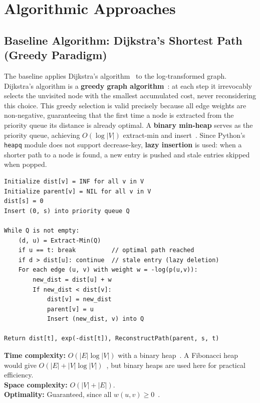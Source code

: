 \section{Algorithmic Approaches}

\subsection{Baseline Algorithm: Dijkstra's Shortest Path (Greedy Paradigm)}

The baseline applies Dijkstra's algorithm~\citep{dijkstra1959} to the log-transformed graph. Dijkstra's algorithm is a \textbf{greedy graph algorithm}~\citep{cormen2009}: at each step it irrevocably selects the unvisited node with the smallest accumulated cost, never reconsidering this choice. This greedy selection is valid precisely because all edge weights are non-negative, guaranteeing that the first time a node is extracted from the priority queue its distance is already optimal. A \textbf{binary min-heap} serves as the priority queue, achieving $O(\log|V|)$ extract-min and insert~\citep{cormen2009}. Since Python's \texttt{heapq} module does not support decrease-key, \textbf{lazy insertion} is used: when a shorter path to a node is found, a new entry is pushed and stale entries skipped when popped.

\begin{tcolorbox}[title=Algorithm 1: Dijkstra on Transformed Probabilities \citep{dijkstra1959,cormen2009}]
\begin{lstlisting}
Initialize dist[v] = INF for all v in V
Initialize parent[v] = NIL for all v in V
dist[s] = 0
Insert (0, s) into priority queue Q

While Q is not empty:
    (d, u) = Extract-Min(Q)
    if u == t: break          // optimal path reached
    if d > dist[u]: continue  // stale entry (lazy deletion)
    For each edge (u, v) with weight w = -log(p(u,v)):
        new_dist = dist[u] + w
        If new_dist < dist[v]:
            dist[v] = new_dist
            parent[v] = u
            Insert (new_dist, v) into Q

Return dist[t], exp(-dist[t]), ReconstructPath(parent, s, t)
\end{lstlisting}
\end{tcolorbox}

\noindent\textbf{Time complexity:} $O(|E| \log |V|)$ with a binary heap~\citep{cormen2009}. A Fibonacci heap would give $O(|E| + |V|\log|V|)$~\citep{fredman1987fibonacci}, but binary heaps are used here for practical efficiency.\\
\textbf{Space complexity:} $O(|V| + |E|)$.\\
\textbf{Optimality:} Guaranteed, since all $w(u,v) \geq 0$~\citep{dijkstra1959}.

